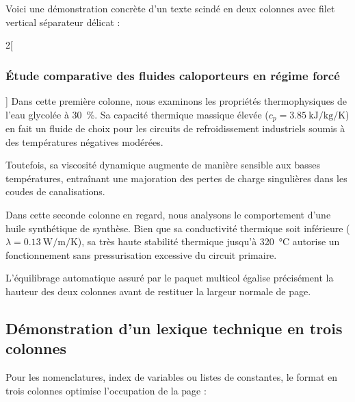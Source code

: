 Voici une démonstration concrète d'un texte scindé en deux colonnes avec filet vertical séparateur délicat :

\setlength{\columnsep}{22pt}
\setlength{\columnseprule}{0.4pt}

\begin{multicols}{2}[\subsubsection*{Étude comparative des fluides caloporteurs en régime forcé}]
  Dans cette première colonne, nous examinons les propriétés thermophysiques de l'eau glycolée à \qty{30}{\percent}.
  Sa capacité thermique massique élevée ($c_p = \qty{3.85}{\kilo\joule\per\kilo\gram\per\kelvin}$) en fait un fluide de choix pour les circuits de refroidissement industriels soumis à des températures négatives modérées.
  
  Toutefois, sa viscosité dynamique augmente de manière sensible aux basses températures, entraînant une majoration des pertes de charge singulières dans les coudes de canalisations.
  
  \columnbreak %
  
  Dans cette seconde colonne en regard, nous analysons le comportement d'une huile synthétique de synthèse.
  Bien que sa conductivité thermique soit inférieure ($\lambda = \qty{0.13}{\watt\per\meter\per\kelvin}$), sa très haute stabilité thermique jusqu'à \qty{320}{\degreeCelsius} autorise un fonctionnement sans pressurisation excessive du circuit primaire.
  
  L'équilibrage automatique assuré par le paquet \textsf{multicol} égalise précisément la hauteur des deux colonnes avant de restituer la largeur normale de page.
\end{multicols}

\setlength{\columnseprule}{0pt} %

\subsection{Démonstration d'un lexique technique en trois colonnes}
\label{subsec:demo_trois_colonnes}

Pour les nomenclatures, index de variables ou listes de constantes, le format en trois colonnes optimise l'occupation de la page :

